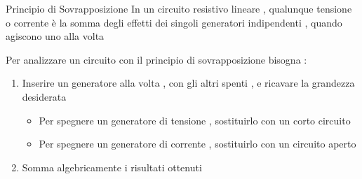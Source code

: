 \documentclass{article}
\theoremstyle{definition}
\begin{document}
\begin{teo*}{Principio di Sovrapposizione}
	In un circuito resistivo lineare , qualunque tensione o corrente è la somma degli effetti dei singoli generatori indipendenti , quando agiscono uno alla volta 
	
\end{teo*}
Per analizzare un circuito con il principio di sovrapposizione bisogna : 
\begin{enumerate}
\item Inserire un generatore alla volta , con gli altri spenti , e ricavare la grandezza desiderata 
	\begin{itemize}
		\item Per spegnere un generatore di tensione , sostituirlo con un corto circuito  
		\item Per spegnere un generatore di corrente , sostituirlo con un circuito aperto 
	\end{itemize}
	\item Somma algebricamente i risultati ottenuti 
\end{enumerate}
\end{document}
